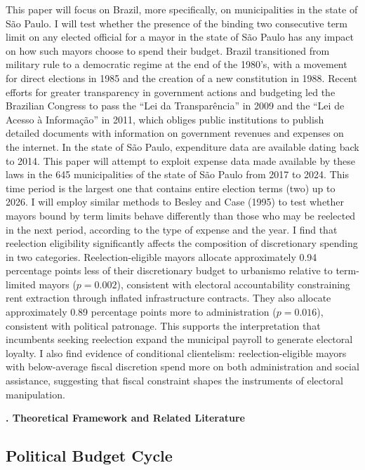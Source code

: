 \documentclass[12pt, a4paper]{article}
\newcounter{headercounter}
\newcommand{\header}[1]{\begin{center}{\large \textbf{\Roman{headercounter}. #1}} \end{center} \stepcounter{headercounter}}
\begin{document}
This paper will focus on Brazil, more specifically, on municipalities in the state of São Paulo. I will test whether the presence of the binding two consecutive term limit on any elected official for a mayor in the state of São Paulo has any impact on how such mayors choose to spend their budget. Brazil transitioned from military rule to a democratic regime at the end of the 1980's, with a movement for direct elections in 1985 and the creation of a new constitution in 1988. Recent efforts for greater transparency in government actions and budgeting led the Brazilian Congress to pass the ``Lei da Transparência'' in 2009 and the ``Lei de Acesso à Informação'' in 2011, which obliges public institutions to publish detailed documents with information on government revenues and expenses on the internet. In the state of São Paulo, expenditure data are available dating back to 2014. This paper will attempt to exploit expense data made available by these laws in the 645 municipalities of the state of São Paulo from 2017 to 2024. This time period is the largest one that contains entire election terms (two) up to 2026. I will employ similar methods to Besley and Case (1995) to test whether mayors bound by term limits behave differently than those who may be reelected in the next period, according to the type of expense and the year. I find that reelection eligibility significantly affects the composition of discretionary spending in two categories. Reelection-eligible mayors allocate approximately 0.94 percentage points less of their discretionary budget to urbanismo relative to term-limited mayors ($p = 0.002$), consistent with electoral accountability constraining rent extraction through inflated infrastructure contracts. They also allocate approximately 0.89 percentage points more to administration ($p = 0.016$), consistent with political patronage. This supports the interpretation that incumbents seeking reelection expand the municipal payroll to generate electoral loyalty. I also find evidence of conditional clientelism: reelection-eligible mayors with below-average fiscal discretion spend more on both administration and social assistance, suggesting that fiscal constraint shapes the instruments of electoral manipulation.

\header{Theoretical Framework and Related Literature}

\subsection*{Political Budget Cycle}
\end{document}
